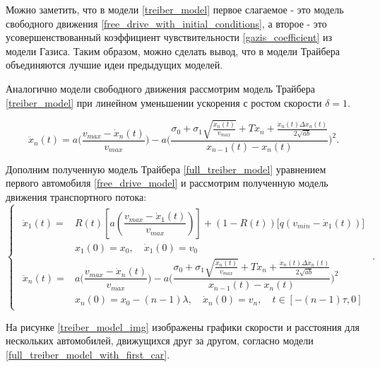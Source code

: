 \documentclass[12pt, a4paper]{extarticle}
\numberwithin{equation}{section}
\begin{document}
Можно заметить, что в модели \eqref{treiber_model} первое слагаемое - это модель свободного движения \eqref{free_drive_with_initial_conditions}, а второе - это усовершенствованный коэффициент чувствительности \eqref{gazis_coefficient} из модели Газиса. Таким образом, можно сделать вывод, что в модели Трайбера объединяются лучшие идеи предыдущих моделей.

Аналогично модели свободного движения рассмотрим модель Трайбера \eqref{treiber_model} при линейном уменьшении ускорения с ростом скорости $\delta=1$.

\begin{equation} \label{full_treiber_model}
\ddot{x}_n(t)= a\bigg(\dfrac{v_{max}-\dot{x}_n(t)}{v_{max}} \bigg) - a\bigg( \dfrac{\sigma_0+\sigma_1\sqrt{\frac{ \dot{x}_n(t)}{v_{max}}} +T \dot{x}_n+ \frac{ \dot{x}_n(t)\Delta \dot{x}_n(t) }{2\sqrt{ab}}}{x_{n-1}(t)-x_n(t)}\bigg)^2.
\end{equation}

Дополним полученную модель Трайбера \eqref{full_treiber_model} уравнением первого автомобиля \eqref{free_drive_model} и рассмотрим полученную модель движения транспортного потока:
\begin{equation} \label{full_treiber_model_with_first_car} 
\begin{cases}
\begin{split}
\ddot{x}_1(t) = &R(t) \left[ a\left(\dfrac{v_{max}-\dot{x}_1(t)}{v_{max}} \right)\right] + (1-R(t)) \bigg[ q\left( v_{min} - \dot{x}_1(t)\right) \bigg]  \\
&x_{1}(0)=x_0, \quad \dot{x}_{1}(0)=v_{0}\\
\ddot{x}_n(t)= &a\bigg(\dfrac{v_{max}-\dot{x}_n(t)}{v_{max}} \bigg) - a\bigg( \dfrac{\sigma_0+\sigma_1\sqrt{\frac{ \dot{x}_n(t)}{v_{max}}} +T \dot{x}_n+ \frac{ \dot{x}_n(t)\Delta \dot{x}_n(t) }{2\sqrt{ab}}}{x_{n-1}(t)-x_n(t)}\bigg)^2 \\
&x_n(0)=x_0-(n-1)\lambda, \quad \dot{x}_n(0)=v_{n}, \quad t \in [-(n-1)\tau,0]
\end{split}
\end{cases}.
\end{equation}

На рисунке \eqref{treiber_model_img} изображены графики скорости и расстояния для нескольких автомобилей, движущихся друг за другом, согласно модели \eqref{full_treiber_model_with_first_car}.
\end{document}
